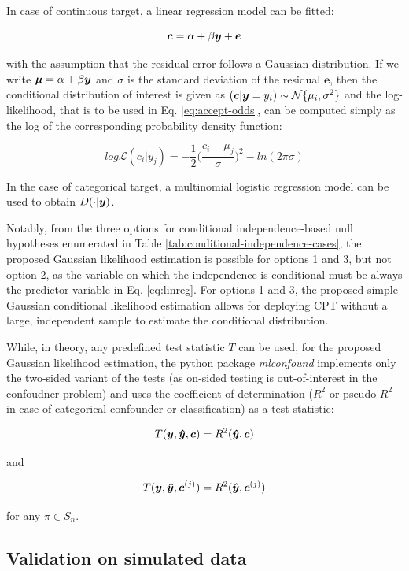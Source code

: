 \documentclass{article}
\begin{document}
In case of continuous target, a linear regression model  can be fitted:

\begin{equation}
    \label{eq:linreg}
    \boldsymbol{c} = \alpha + \beta \boldsymbol{y} + \boldsymbol{e}
\end{equation}


with the assumption that the residual error follows a Gaussian distribution. If we write $\boldsymbol{\mu} = \alpha + \beta \boldsymbol{y}$ and $\sigma$ is the standard deviation of the residual $\boldsymbol{e}$, then the conditional distribution of interest is given as $ (\boldsymbol{c}|\boldsymbol{y}=y_i) \sim \mathcal{N}\{\mu_i, \sigma^2\}$ and the log-likelihood, that is to be used in Eq. \ref{eq:accept-odds}, can be computed simply as the log of the corresponding probability density function:

$$ log\mathcal{L}(c_i|y_j) = - \frac{1}{2} \Big(\frac{c_i-\mu_j}{\sigma}\Big)^2 - ln(2 \pi \sigma)   $$


In the case of categorical target, a multinomial logistic regression model can be used to obtain $D(\cdot|\boldsymbol{y})$.

Notably, from the three options for conditional independence-based null hypotheses enumerated in Table \ref{tab:conditional-independence-cases}, the proposed Gaussian likelihood estimation is possible for options 1 and 3, but not option 2, as the variable on which the independence is conditional must be always the predictor variable in Eq. \ref{eq:linreg}.
For options 1 and 3, the proposed simple Gaussian conditional likelihood estimation allows for deploying CPT without a large, independent sample to estimate the conditional distribution. 

While, in theory, any predefined test statistic $T$ can be used, for the proposed Gaussian likelihood estimation, the python package \emph{mlconfound} implements only the two-sided variant of the tests (as on-sided testing is out-of-interest in the confoudner problem) and uses the coefficient of determination ($R^2$ or pseudo $R^2$ in case of categorical confounder or classification) as a test statistic:

$$T(\boldsymbol{y}, \boldsymbol{\hat{y}}, \boldsymbol{c}) = R^2(\boldsymbol{\hat{y}}, \boldsymbol{c})$$ 

and

$$T(\boldsymbol{y}, \boldsymbol{\hat{y}}, \boldsymbol{c}^{(j)}) = R^2(\boldsymbol{\hat{y}}, \boldsymbol{c}^{(j)})$$ 

for any $\pi \in S_n$.

\subsection{Validation on simulated data}
\end{document}
